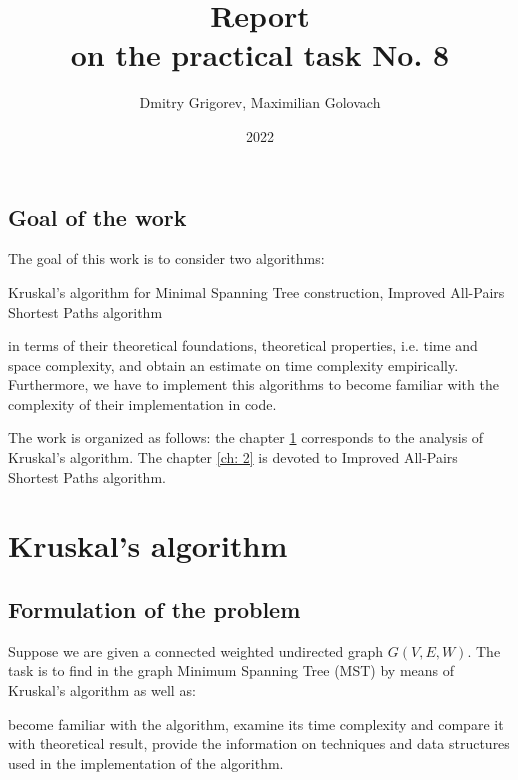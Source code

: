 \documentclass[12pt, bachelor, substylefile = algo_title.rtx]{disser}
\theoremstyle{definition}
\begin{document}
\title{Report\\
on the practical task No. 8}


\author{Dmitry Grigorev, Maximilian Golovach}
\sastatus {}

\date{2022}

\maketitle
\section*{Goal of the work}
The goal of this work is to consider two algorithms:
\begin{outline}
\1 Kruskal's algorithm for Minimal Spanning Tree construction,
\1 Improved All-Pairs Shortest Paths algorithm
\end{outline}
in terms of their theoretical foundations, theoretical properties, i.e. time and space complexity, and obtain an estimate on time complexity empirically. Furthermore, we have to implement this algorithms to become familiar with the complexity of their implementation in code.

The work is organized as follows: the chapter \ref{ch: 1} corresponds to the analysis of Kruskal's algorithm. The chapter \ref{ch: 2} is devoted to Improved All-Pairs Shortest Paths algorithm.

\chapter{Kruskal's algorithm}
\label{ch: 1}
\section{Formulation of the problem}
Suppose we are given a connected weighted undirected graph $G(V, E, W)$. The task is to find in the graph Minimum Spanning Tree (MST) by means of Kruskal's algorithm as well as:
\begin{outline}
\1 become familiar with the algorithm,
\1 examine its time complexity and compare it with theoretical result,
\1 provide the information on techniques and data structures used in the implementation of the algorithm.
\end{outline}
\end{document}
